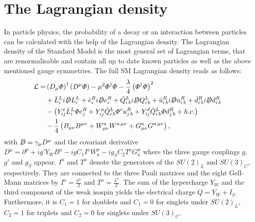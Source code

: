 \section{The Lagrangian density}
In particle physics, the probability of a decay or an interaction between particles can be calculated with the help of the Lagrangian density.
The Lagrangian density of the Standard Model is the most general set of Lagrangian terms, that are renormalisable and contain all up to date known particles as well as the above mentioned gauge symmetries.
The full SM Lagrangian density reads as follows:
\begin{equation}
\begin{split}
 \mathcal{L} =& \left( D_{\mu} \Phi \right)^{\dagger} \left( D^{\mu} \Phi \right) -\mu^2\Phi^{\dagger} \Phi -\frac{\lambda}{4} \left( \Phi^{\dagger} \Phi \right)^2\\
 & + \bar{L}^L_i i \slashed{D} L^{L}_i + \bar{e}^{R}_i i \slashed{D} e^{R}_i +  \bar{Q}^L_{i\,b} i \slashed{D} Q^L_{i\,b} + \bar{u}^{R}_{i\,b} i \slashed{D} u^{R}_{i\,b} +
\bar{d}^{R}_{i\,b} i \slashed{D} d^{R}_{i\,b}\\
& - \left( Y^e_{ij} \bar{L}^L_i \Phi e^R_j + Y^u_{ij} \bar{Q}^L_{i\,b} \Phi^c u^R_{j\,b} + Y^d_{ij} \bar{Q}^L_{i\,b} \Phi d^R_{j\,b} + h.c. \right)\\
& - \frac{1}{4} \left( B_{\mu\nu}  B^{\mu\nu} +  W^a_{\mu\nu} W^{a\,\mu\nu} +  G^a_{\mu\nu} G^{a\,\mu\nu}    \right),
\end{split}
\label{eq:LagrangianDensity}
\end{equation}
with $\slashed{D} = \gamma_{\mu} D^{\mu}$ and the covariant derivative $D^{\mu}=\partial^{\mu} + i g' Y_W B^{\mu} - i g C_1  I^a W_a^{\mu}  - i g_S C_2 T^a G_a^{\mu}$ where the three gauge couplings $g$, $g'$ and $g_S$ appear.
$I^a$ and $T^a$ denote the generators of the $SU(2)_L$ and $SU(3)_C$, respectively.
They are connected to the three Pauli matrices and the eight Gell-Mann matrices by $I^a = \frac{\sigma^a}{2}$ and $T^a = \frac{\lambda^a}{2}$.
The sum of the hypercharge $Y_W$ and the third component of the weak isospin yields the electrical charge $Q=Y_W + I_3$.
Furthermore, it is $C_1=1 $ for doublets and $C_1=0$ for singlets under $SU(2)_L$, $C_2=1$ for triplets and $C_2=0 $ for singlets under $SU(3)_C$.  

